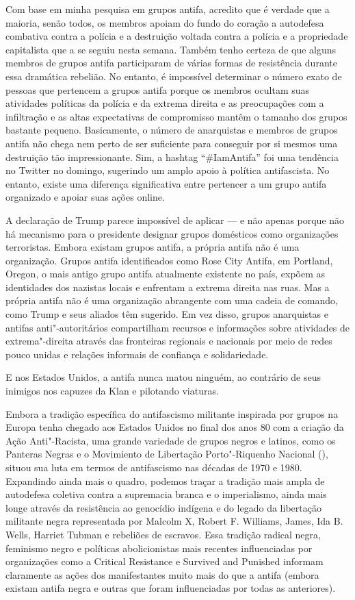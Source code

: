 Com base em minha pesquisa em grupos antifa, acredito que é verdade que a maioria, senão todos, os membros apoiam do fundo do coração a autodefesa combativa contra a polícia e a destruição voltada contra a polícia e a propriedade capitalista que a se seguiu nesta semana. Também tenho certeza de que alguns membros de grupos antifa participaram de várias formas de resistência durante essa dramática rebelião. No entanto, é impossível determinar o número exato de pessoas que pertencem a grupos antifa porque os membros ocultam suas atividades políticas da polícia e da extrema direita e as preocupações com a infiltração e as altas expectativas de compromisso mantêm o tamanho dos grupos bastante pequeno. Basicamente, o número de anarquistas e membros de grupos antifa não chega nem perto de ser suficiente para conseguir por si mesmos uma destruição tão impressionante. Sim, a hashtag ``\#IamAntifa'' foi uma tendência no Twitter no domingo, sugerindo um amplo apoio à política antifascista. No entanto, existe uma diferença significativa entre pertencer a um grupo antifa organizado e apoiar suas ações online.

A declaração de Trump parece impossível de aplicar — e não apenas porque não há mecanismo para o presidente designar grupos domésticos como organizações terroristas. Embora existam grupos antifa, a própria antifa não é uma organização. Grupos antifa identificados como Rose City Antifa, em Portland, Oregon, o mais antigo grupo antifa atualmente existente no país, expõem as identidades dos nazistas locais e enfrentam a extrema direita nas ruas. Mas a própria antifa não é uma organização abrangente com uma cadeia de comando, como Trump e seus aliados têm sugerido. Em vez disso, grupos anarquistas e antifas anti"-autoritários compartilham recursos e informações sobre atividades de extrema"-direita através das fronteiras regionais e nacionais por meio de redes pouco unidas e relações informais de confiança e solidariedade.
 
E nos Estados Unidos, a antifa nunca matou ninguém, ao contrário de seus inimigos nos capuzes da Klan e pilotando viaturas.

Embora a tradição específica do antifascismo militante inspirada por grupos na Europa tenha chegado aos Estados Unidos no final dos anos 80 com a criação da Ação Anti"-Racista, uma grande variedade de grupos negros e latinos, como os Panteras Negras e o Movimiento de Libertação Porto"-Riquenho Nacional (), situou sua luta em termos de antifascismo nas décadas de 1970 e 1980. Expandindo ainda mais o quadro, podemos traçar a tradição mais ampla de autodefesa coletiva contra a supremacia branca e o imperialismo, ainda mais longe através da resistência ao genocídio indígena e do legado da libertação militante negra representada por Malcolm X, Robert F. Williams,  James, Ida B. Wells, Harriet Tubman e rebeliões de escravos. Essa tradição radical negra, feminismo negro e políticas abolicionistas mais recentes influenciadas por organizações como a Critical Resistance e Survived and Punished informam claramente as ações dos manifestantes muito mais do que a antifa (embora existam antifa negra e outras que foram influenciadas por todas as anteriores).
 
